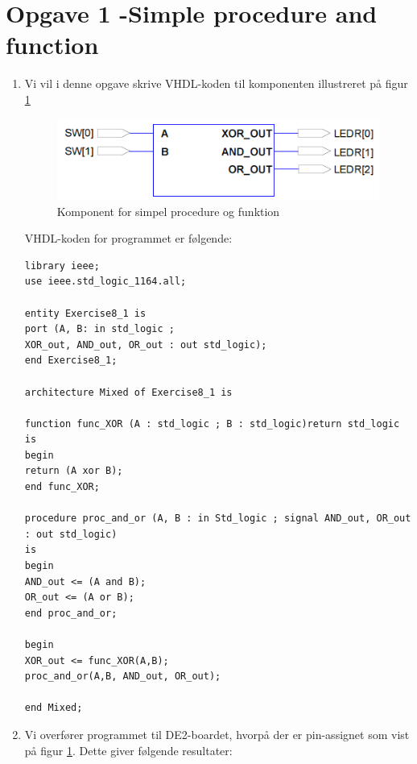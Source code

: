 \section{Opgave 1 -Simple procedure and function}
\begin{enumerate}
	\item[1)]
	
	Vi vil i denne opgave skrive VHDL-koden til komponenten illustreret på figur \ref{fig:component}
	\begin{figure}[h]
		\centering
		\includegraphics[scale=0.9]{pictures/Oevelse8/opg1/components}
		\caption{Komponent for simpel procedure og funktion}
		\label{fig:component}
	\end{figure}
	
	VHDL-koden for programmet er følgende:
	
\begin{lstlisting}[caption={Kode for simple procedure and function},label={lst:opg1_1}]
library ieee;
use ieee.std_logic_1164.all;

entity Exercise8_1 is
port (A, B: in std_logic ;
XOR_out, AND_out, OR_out : out std_logic);
end Exercise8_1;

architecture Mixed of Exercise8_1 is

function func_XOR (A : std_logic ; B : std_logic)return std_logic is
begin 
return (A xor B);
end func_XOR;

procedure proc_and_or (A, B : in Std_logic ; signal AND_out, OR_out : out std_logic) 
is 
begin 
AND_out <= (A and B);
OR_out <= (A or B);
end proc_and_or;

begin 
XOR_out <= func_XOR(A,B);
proc_and_or(A,B, AND_out, OR_out);

end Mixed;
\end{lstlisting}

\item[2)]
Vi overfører programmet til DE2-boardet, hvorpå der er pin-assignet som vist på figur \ref{fig:component}. Dette giver følgende resultater:


\end{enumerate}
